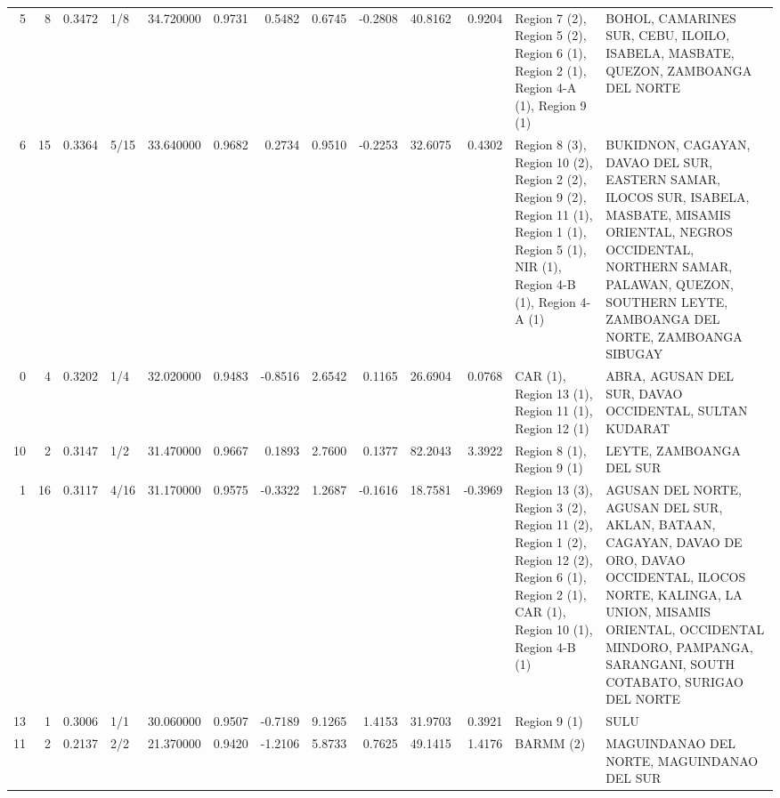 \begin{tabular}{rrrlrrrrrrrll}
5 & 8 & {\cellcolor[HTML]{F7AA8C}} \color[HTML]{000000} 0.3472 & 1/8 & {\cellcolor[HTML]{F7AA8C}} \color[HTML]{000000} 34.720000 & 0.9731 & 0.5482 & 0.6745 & -0.2808 & 40.8162 & 0.9204 & Region 7 (2), Region 5 (2), Region 6 (1), Region 2 (1), Region 4-A (1), Region 9 (1) & BOHOL, CAMARINES SUR, CEBU, ILOILO, ISABELA, MASBATE, QUEZON, ZAMBOANGA DEL NORTE \\
6 & 15 & {\cellcolor[HTML]{F7B89C}} \color[HTML]{000000} 0.3364 & 5/15 & {\cellcolor[HTML]{F7B89C}} \color[HTML]{000000} 33.640000 & 0.9682 & 0.2734 & 0.9510 & -0.2253 & 32.6075 & 0.4302 & Region 8 (3), Region 10 (2), Region 2 (2), Region 9 (2), Region 11 (1), Region 1 (1), Region 5 (1), NIR (1), Region 4-B (1), Region 4-A (1) & BUKIDNON, CAGAYAN, DAVAO DEL SUR, EASTERN SAMAR, ILOCOS SUR, ISABELA, MASBATE, MISAMIS ORIENTAL, NEGROS OCCIDENTAL, NORTHERN SAMAR, PALAWAN, QUEZON, SOUTHERN LEYTE, ZAMBOANGA DEL NORTE, ZAMBOANGA SIBUGAY \\
0 & 4 & {\cellcolor[HTML]{F2C9B4}} \color[HTML]{000000} 0.3202 & 1/4 & {\cellcolor[HTML]{F2C9B4}} \color[HTML]{000000} 32.020000 & 0.9483 & -0.8516 & 2.6542 & 0.1165 & 26.6904 & 0.0768 & CAR (1), Region 13 (1), Region 11 (1), Region 12 (1) & ABRA, AGUSAN DEL SUR, DAVAO OCCIDENTAL, SULTAN KUDARAT \\
10 & 2 & {\cellcolor[HTML]{F0CDBB}} \color[HTML]{000000} 0.3147 & 1/2 & {\cellcolor[HTML]{F0CDBB}} \color[HTML]{000000} 31.470000 & 0.9667 & 0.1893 & 2.7600 & 0.1377 & 82.2043 & 3.3922 & Region 8 (1), Region 9 (1) & LEYTE, ZAMBOANGA DEL SUR \\
1 & 16 & {\cellcolor[HTML]{EED0C0}} \color[HTML]{000000} 0.3117 & 4/16 & {\cellcolor[HTML]{EED0C0}} \color[HTML]{000000} 31.170000 & 0.9575 & -0.3322 & 1.2687 & -0.1616 & 18.7581 & -0.3969 & Region 13 (3), Region 3 (2), Region 11 (2), Region 1 (2), Region 12 (2), Region 6 (1), Region 2 (1), CAR (1), Region 10 (1), Region 4-B (1) & AGUSAN DEL NORTE, AGUSAN DEL SUR, AKLAN, BATAAN, CAGAYAN, DAVAO DE ORO, DAVAO OCCIDENTAL, ILOCOS NORTE, KALINGA, LA UNION, MISAMIS ORIENTAL, OCCIDENTAL MINDORO, PAMPANGA, SARANGANI, SOUTH COTABATO, SURIGAO DEL NORTE \\
13 & 1 & {\cellcolor[HTML]{E6D7CF}} \color[HTML]{000000} 0.3006 & 1/1 & {\cellcolor[HTML]{E6D7CF}} \color[HTML]{000000} 30.060000 & 0.9507 & -0.7189 & 9.1265 & 1.4153 & 31.9703 & 0.3921 & Region 9 (1) & SULU \\
11 & 2 & {\cellcolor[HTML]{82A6FB}} \color[HTML]{F1F1F1} 0.2137 & 2/2 & {\cellcolor[HTML]{82A6FB}} \color[HTML]{F1F1F1} 21.370000 & 0.9420 & -1.2106 & 5.8733 & 0.7625 & 49.1415 & 1.4176 & BARMM (2) & MAGUINDANAO DEL NORTE, MAGUINDANAO DEL SUR \\

\end{tabular}
